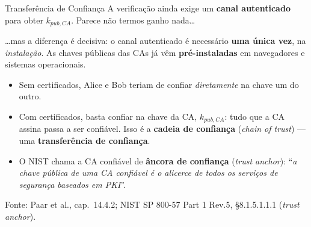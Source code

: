 \documentclass{beamer}
\begin{document}
\begin{frame}{Transferência de Confiança}
    A verificação ainda exige um \textbf{canal autenticado} para obter $k_{pub,CA}$. Parece não termos ganho nada\dots
    \medskip
    \begin{tcolorbox}[colback=green!6,colframe=green!50!black,boxrule=0.5pt]
        \footnotesize
        \dots mas a diferença é decisiva: o canal autenticado é necessário \textbf{uma única vez}, na \emph{instalação}. As chaves públicas das CAs já vêm \textbf{pré-instaladas} em navegadores e sistemas operacionais.
    \end{tcolorbox}
    \medskip
    \begin{itemize}
        \footnotesize
        \item Sem certificados, Alice e Bob teriam de confiar \emph{diretamente} na chave um do outro.
        \item Com certificados, basta confiar na chave da CA, $k_{pub,CA}$: tudo que a CA assina passa a ser confiável. Isso é a \textbf{cadeia de confiança} (\textit{chain of trust}) --- uma \textbf{transferência de confiança}.
        \item O NIST chama a CA confiável de \textbf{âncora de confiança} (\textit{trust anchor}): ``\emph{a chave pública de uma CA confiável é o alicerce de todos os serviços de segurança baseados em PKI}''.
    \end{itemize}
    \smallskip
    {\tiny Fonte: Paar et al., cap.\ 14.4.2; NIST SP 800-57 Part 1 Rev.5, §8.1.5.1.1.1 (\textit{trust anchor}).}
\end{frame}
\end{document}
